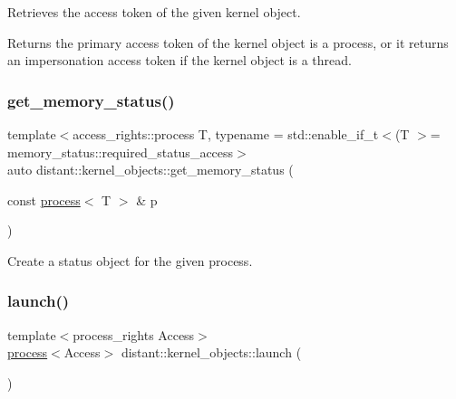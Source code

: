 Retrieves the access token of the given kernel object. 

\begin{DoxyReturn}{Returns}
the primary access token of the kernel object is a process, or it returns an impersonation access token if the kernel object is a thread. 
\end{DoxyReturn}
\mbox{\label{namespacedistant_1_1kernel__objects_a02d495947c0d42362c2b0c22c7279c73}} 
\subsubsection{\texorpdfstring{get\+\_\+memory\+\_\+status()}{get\_memory\_status()}}
{\footnotesize\ttfamily template$<$access\+\_\+rights\+::process T, typename  = std\+::enable\+\_\+if\+\_\+t$<$(\+T $>$= memory\+\_\+status\+::required\+\_\+status\+\_\+access$>$ \\
auto distant\+::kernel\+\_\+objects\+::get\+\_\+memory\+\_\+status (\begin{DoxyParamCaption}\item[{const \mbox{\hyperlink{classdistant_1_1kernel__objects_1_1process}{process}}$<$ T $>$ \&}]{p }\end{DoxyParamCaption})}



Create a status object for the given process. 

\mbox{\label{namespacedistant_1_1kernel__objects_a4f266ac49d365b14ca51b09160e19f47}} 
\subsubsection{\texorpdfstring{launch()}{launch()}}
{\footnotesize\ttfamily template$<$process\+\_\+rights Access$>$ \\
\mbox{\hyperlink{classdistant_1_1kernel__objects_1_1process}{process}}$<$Access$>$ distant\+::kernel\+\_\+objects\+::launch (\begin{DoxyParamCaption}{ }\end{DoxyParamCaption})}



